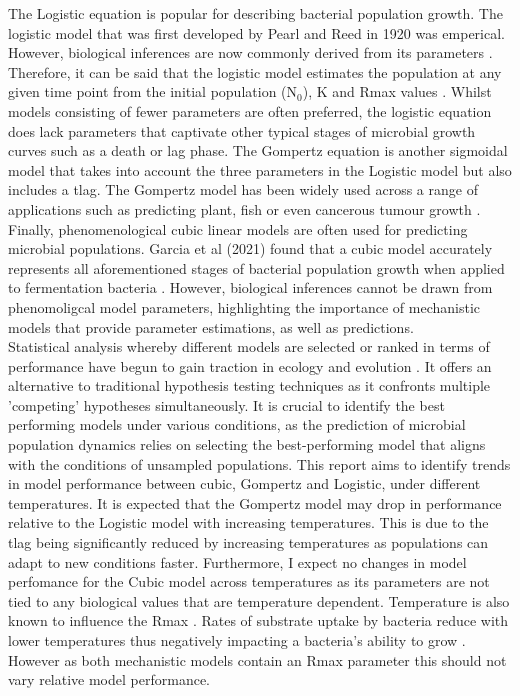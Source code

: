 \documentclass[12pt]{article}
\begin{document}
The Logistic equation is popular for describing bacterial population growth. The logistic model that was first developed by Pearl and Reed in 1920 was emperical. However, biological inferences are now commonly derived from its parameters \cite{WACHENHEIM2003157} \cite{Pearl1920}. Therefore, it can be said that the logistic model estimates the population at any given time point from the initial population ($\mathrm{N}_0$), K and Rmax values \cite{WACHENHEIM2003157}. Whilst models consisting of fewer parameters are often preferred, the logistic equation does lack parameters that captivate other typical stages of microbial growth curves such as a death or lag phase. The Gompertz equation is another sigmoidal model that takes into account the three parameters in the Logistic model but also includes a tlag. The Gompertz model has been widely used across a range of applications such as predicting plant, fish or even cancerous tumour growth \cite{Tjrve2017}. Finally, phenomenological cubic linear models are often used for predicting microbial populations. Garcia et al (2021) found that a cubic model accurately represents all aforementioned stages of bacterial population growth when applied to fermentation bacteria \cite{Garcia2021}. However, biological inferences cannot be drawn from phenomoligcal model parameters, highlighting the importance of mechanistic models that provide parameter estimations, as well as predictions.\\

Statistical analysis whereby different models are selected or ranked in terms of performance have begun to gain traction in ecology and evolution \cite{JOHNSON2004101}. It offers an alternative to traditional hypothesis testing techniques as it confronts multiple 'competing' hypotheses simultaneously. It is crucial to identify the best performing models under various conditions, as the prediction of microbial population dynamics relies on selecting the best-performing model that aligns with the conditions of unsampled populations. This report aims to identify trends in model performance between cubic, Gompertz and Logistic, under different temperatures. It is expected that the Gompertz model may drop in performance relative to the Logistic model with increasing temperatures. This is due to the tlag being significantly reduced by increasing temperatures \cite{ABA2021109108} as populations can adapt to new conditions faster. Furthermore, I expect no changes in model perfomance for the Cubic model across temperatures as its parameters are not tied to any biological values that are temperature dependent. Temperature is also known to influence the Rmax \cite{Ward1972} \cite{Dey2020}. Rates of substrate uptake by bacteria reduce with lower temperatures thus negatively impacting a bacteria's ability to grow \cite{Nedwell1994}. However as both mechanistic models contain an Rmax parameter this should not vary relative model performance.\\
\end{document}
